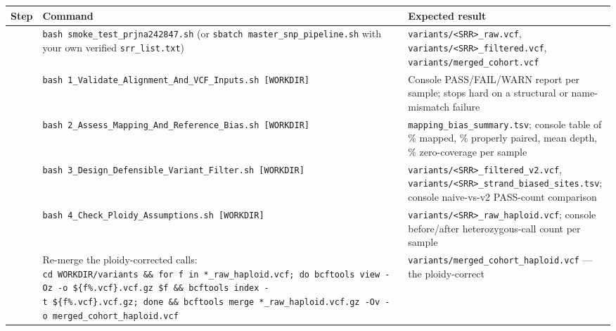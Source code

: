 \documentclass[
]{article}
\newcounter{none} %
\begin{document}
{\def\LTcaptype{none} %
\begin{longtable}[]{@{}
  >{\raggedright\arraybackslash}p{}
  >{\raggedright\arraybackslash}p{}
  >{\raggedright\arraybackslash}p{}@{}}
\toprule\noalign{}
\begin{minipage}[b]{\linewidth}\raggedright
Step
\end{minipage} & \begin{minipage}[b]{\linewidth}\raggedright
Command
\end{minipage} & \begin{minipage}[b]{\linewidth}\raggedright
Expected result
\end{minipage} \\
\midrule\noalign{}
\endhead
\bottomrule\noalign{}
\endlastfoot
1 & \texttt{bash\ smoke\_test\_prjna242847.sh} (or
\texttt{sbatch\ master\_snp\_pipeline.sh} with your own verified
\texttt{srr\_list.txt}) &
\texttt{variants/\textless{}SRR\textgreater{}\_raw.vcf},
\texttt{variants/\textless{}SRR\textgreater{}\_filtered.vcf},
\texttt{variants/merged\_cohort.vcf} \\
2 &
\texttt{bash\ 1\_Validate\_Alignment\_And\_VCF\_Inputs.sh\ {[}WORKDIR{]}}
& Console PASS/FAIL/WARN report per sample; stops hard on a structural
or name-mismatch failure \\
3 &
\texttt{bash\ 2\_Assess\_Mapping\_And\_Reference\_Bias.sh\ {[}WORKDIR{]}}
& \texttt{mapping\_bias\_summary.tsv}; console table of \% mapped, \%
properly paired, mean depth, \% zero-coverage per sample \\
4 &
\texttt{bash\ 3\_Design\_Defensible\_Variant\_Filter.sh\ {[}WORKDIR{]}}
& \texttt{variants/\textless{}SRR\textgreater{}\_filtered\_v2.vcf},
\texttt{variants/\textless{}SRR\textgreater{}\_strand\_biased\_sites.tsv};
console naive-vs-v2 PASS-count comparison \\
5 & \texttt{bash\ 4\_Check\_Ploidy\_Assumptions.sh\ {[}WORKDIR{]}} &
\texttt{variants/\textless{}SRR\textgreater{}\_raw\_haploid.vcf};
console before/after heterozygous-call count per sample \\
6 & Re-merge the ploidy-corrected calls:
\texttt{cd\ WORKDIR/variants\ \&\&\ for\ f\ in\ *\_raw\_haploid.vcf;\ do\ bcftools\ view\ -Oz\ -o\ \$\{f\%.vcf\}.vcf.gz\ \$f\ \&\&\ bcftools\ index\ -t\ \$\{f\%.vcf\}.vcf.gz;\ done\ \&\&\ bcftools\ merge\ *\_raw\_haploid.vcf.gz\ -Ov\ -o\ merged\_cohort\_haploid.vcf}
& \texttt{variants/merged\_cohort\_haploid.vcf} --- the ploidy-correct

\end{longtable}}
\end{document}
